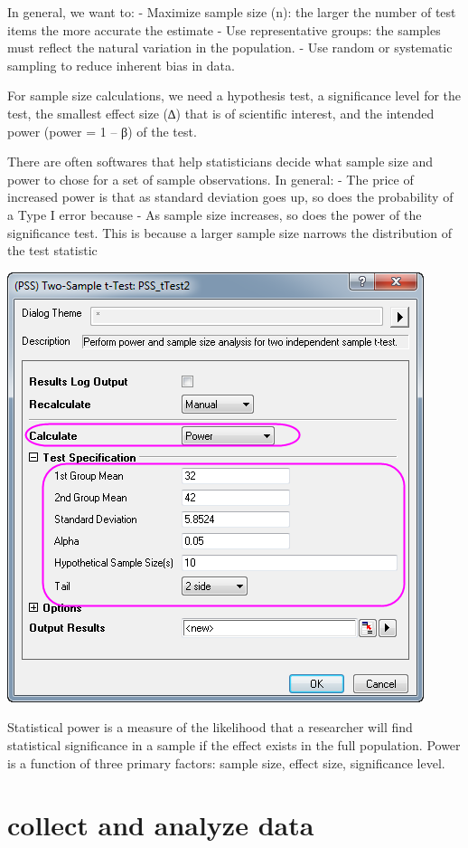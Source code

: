 \documentclass[]{book}
\begin{document}
In general, we want to:
- Maximize sample size (n): the larger the number of test items the more accurate the estimate
- Use representative groups: the samples must reflect the natural variation in the population.
- Use random or systematic sampling to reduce inherent bias in data.

For sample size calculations, we need a hypothesis test, a significance level for the test, the smallest effect size (∆) that is of scientific interest, and the intended power (power = 1 -- β) of the test.

There are often softwares that help statisticians decide what sample size and power to chose for a set of sample observations. In general:
- The price of increased power is that as standard deviation goes up, so does the probability of a Type I error because
- As sample size increases, so does the power of the significance test. This is because a larger sample size narrows the distribution of the test statistic

\includegraphics{fig/samplesize.png}

Statistical power is a measure of the likelihood that a researcher will find statistical significance in a sample if the effect exists in the full population. Power is a function of three primary factors: sample size, effect size, significance level.

\hypertarget{collect-and-analyze-data}{%
\section{collect and analyze data}\label{collect-and-analyze-data}}
\end{document}
